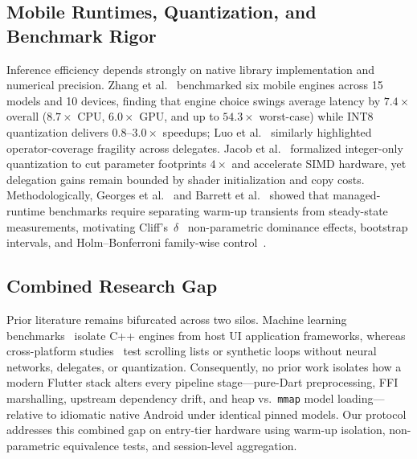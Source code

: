 \subsection{Mobile Runtimes, Quantization, and Benchmark Rigor}
Inference efficiency depends strongly on native library implementation and numerical precision. Zhang et al.~\cite{zhang2022comprehensive} benchmarked six mobile engines across 15 models and 10 devices, finding that engine choice swings average latency by $7.4\times$ overall ($8.7\times$ CPU, $6.0\times$ GPU, and up to $54.3\times$ worst-case) while INT8 quantization delivers $0.8\text{--}3.0\times$ speedups; Luo et al.~\cite{luo2020comparison} similarly highlighted operator-coverage fragility across delegates. Jacob et al.~\cite{jacob2018quantization} formalized integer-only quantization to cut parameter footprints $4\times$ and accelerate SIMD hardware, yet delegation gains remain bounded by shader initialization and copy costs. Methodologically, Georges et al.~\cite{georges2007statistically} and Barrett et al.~\cite{barrett2017virtual} showed that managed-runtime benchmarks require separating warm-up transients from steady-state measurements, motivating Cliff's~$\delta$~\cite{cliff1993dominance} non-parametric dominance effects, bootstrap intervals, and Holm--Bonferroni family-wise control~\cite{holm1979simple}.

\subsection{Combined Research Gap}\label{subsec:gap}
Prior literature remains bifurcated across two silos. Machine learning benchmarks~\cite{ignatov2019ai,reddi2022mlperfmobile,zhang2022comprehensive,wang2025lmmeter} isolate C++ engines from host UI application frameworks, whereas cross-platform studies~\cite{biornhansen2020empirical,horn2023native,nanavati2024critical} test scrolling lists or synthetic loops without neural networks, delegates, or quantization. Consequently, no prior work isolates how a modern Flutter stack alters every pipeline stage---pure-Dart preprocessing, FFI marshalling, upstream dependency drift, and heap vs.\ \texttt{mmap} model loading---relative to idiomatic native Android under identical pinned models. Our protocol addresses this combined gap on entry-tier hardware using warm-up isolation, non-parametric equivalence tests, and session-level aggregation.
